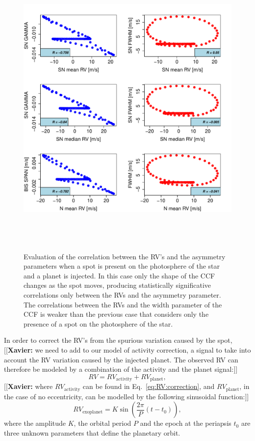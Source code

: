 \documentclass{aa}
\newcommand{\xavier}[1]{{\color{blue}[[\textbf{Xavier: }#1]]}}
\begin{document}
\begin{figure}[htbp]
\begin{center}
\includegraphics[height = 6in]{SOAP_SPOT_PLANET_Comparison_para_SN.pdf} 
   \caption{Evaluation of the correlation between the RV's and the asymmetry parameters when a spot is present on the photosphere of the star and a planet is injected.  In this case only the shape of the CCF changes as the spot moves, producing statistically significative correlations only between the RVs and the asymmetry parameter. The correlations between the RVs and the width parameter of the CCF is weaker than the previous case that considers only the presence of a spot on the photosphere of the star.}
    \label{fig:spot.plus.planet.corr}
\end{center}
\end{figure}

In order to correct the RV's from the spurious variation caused by the spot, \xavier{we need to add to our model of activity correction, a signal to take into account the RV variation caused by the injected planet. The observed RV can therefore be modeled by a combination of the activity and the planet signal:}
%
\begin{equation}
RV= RV_{\text{activity}} + RV_{\text{planet}},
\label{eq:RV:correction.overall}
\end{equation}
%
\xavier{where $RV_{\text{activity}}$ can be found in Eq.~\ref{eq:RV:correction}, and $RV_{\text{planet}}$, in the case of no eccentricity, can be modelled by the following sinusoidal function:}
%
\begin{equation}
RV_{\text{exoplanet}}= K \sin \left(\frac{2 \pi}{P} (t - t_{0})\right),
\label{eq:RV:correction.planet}
\end{equation}
%
where the amplitude $K$, the orbital period $P$ and the epoch at the periapsis $t_{0}$ are three unknown parameters that define the planetary orbit.
\end{document}
